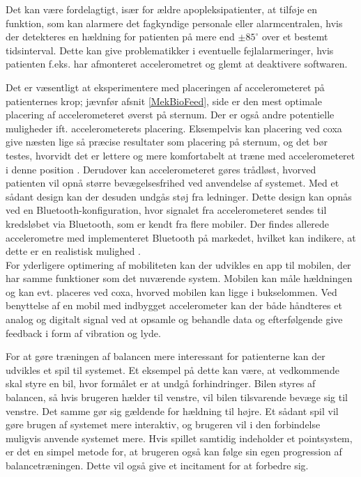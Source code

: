 Det kan være fordelagtigt, især for ældre apopleksipatienter, at tilføje en funktion, som kan alarmere det fagkyndige personale eller alarmcentralen, hvis der detekteres en hældning for patienten på mere end $\pm85^{\circ}$ over et bestemt tidsinterval. Dette kan give problematikker i eventuelle fejlalarmeringer, hvis patienten f.eks. har afmonteret accelerometret og glemt at deaktivere softwaren.

Det er væsentligt at eksperimentere med placeringen af accelerometeret på patienternes krop; jævnfør afsnit \ref{MekBioFeed}, side \pageref{MekBioFeed} er den mest optimale placering af accelerometeret øverst på sternum. Der er også andre potentielle muligheder ift. accelerometerets placering. Eksempelvis kan placering ved coxa give næsten lige så præcise resultater som placering på sternum, og det bør testes, hvorvidt det er lettere og mere komfortabelt at træne med accelerometeret i denne position \cite{Gjoreski2011}. Derudover kan accelerometeret gøres trådløst, hvorved patienten vil opnå større bevægelsesfrihed ved anvendelse af systemet. Med et sådant design kan der desuden undgås støj fra ledninger. Dette design kan opnås ved en Bluetooth-konfiguration, hvor signalet fra accelerometeret sendes til kredsløbet via Bluetooth, som er kendt fra flere mobiler. Der findes allerede accelerometre med implementeret Bluetooth på markedet, hvilket kan indikere, at dette er en realistisk mulighed \cite{Axivity2015,Bioradio2015}. \\
For yderligere optimering af mobiliteten kan der udvikles en app til mobilen, der har samme funktioner som det nuværende system. Mobilen kan måle hældningen og kan evt. placeres ved coxa, hvorved mobilen kan ligge i bukselommen. Ved benyttelse af en mobil med indbygget accelerometer kan der både håndteres et analog og digitalt signal ved at opsamle og behandle data og efterfølgende give feedback i form af vibration og lyde. %

For at gøre træningen af balancen mere interessant for patienterne kan der udvikles et spil til systemet. Et eksempel på dette kan være, at vedkommende skal styre en bil, hvor formålet er at undgå forhindringer. Bilen styres af balancen, så hvis brugeren hælder til venstre, vil bilen tilsvarende bevæge sig til venstre. Det samme gør sig gældende for hældning til højre. Et sådant spil vil gøre brugen af systemet mere interaktiv, og brugeren vil i den forbindelse muligvis anvende systemet mere. Hvis spillet samtidig indeholder et pointsystem, er det en simpel metode for, at brugeren også kan følge sin egen progression af balancetræningen. Dette vil også give et incitament for at forbedre sig. 
